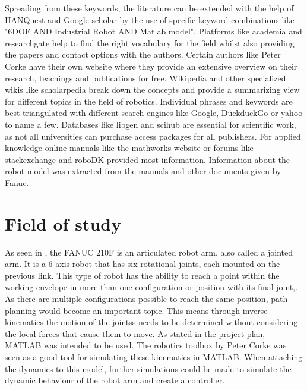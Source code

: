 Spreading from these keywords, the literature can be extended with the help of HANQuest and Google scholar by the use of specific keyword combinations like "6DOF AND Industrial Robot AND Matlab model". Platforms like academia and researchgate help to find the right vocabulary for the field whilst also providing the papers and contact options with the authors. Certain authors like Peter Corke have their own website where they provide an extensive overview on their research, teachings and publications for free. Wikipedia and other specialized wikis like scholarpedia break down the concepts and provide a summarizing view for different topics in the field of robotics. Individual phrases and keywords are best triangulated with different search engines like Google, DuckduckGo or yahoo to name a few. Databases like libgen and scihub are essential for scientific work, as not all universities can purchase access packages for all publishers. For applied knowledge online manuals like the mathworks website  or forums like stackexchange and roboDK provided most information. Information about the robot model was extracted from the manuals and other documents given by Fanuc.




\section{Field of study}

As seen in %
\cite{IndustrialRobotArm}, the FANUC 210F is an articulated robot arm, also called a jointed arm. It is a 6 axis robot that has six rotational \gls{joints}, each mounted on the previous \gls{link}. %
This type of robot has the ability to reach a point within the working envelope in more than one configuration or position with its final joint,. 
As there are multiple configurations possible to reach the same position, path planning would become an important topic. 
This means through inverse kinematics  the motion of the \glspl{joints} needs to be determined without considering the local forces that cause them to move.
As stated in the project plan, MATLAB was intended to be used.
The robotics toolbox by Peter Corke was seen as a good tool for simulating these kinematics in MATLAB. 
When attaching the dynamics to this model, further simulations could be made to simulate the dynamic behaviour of the robot arm and create a controller. 


